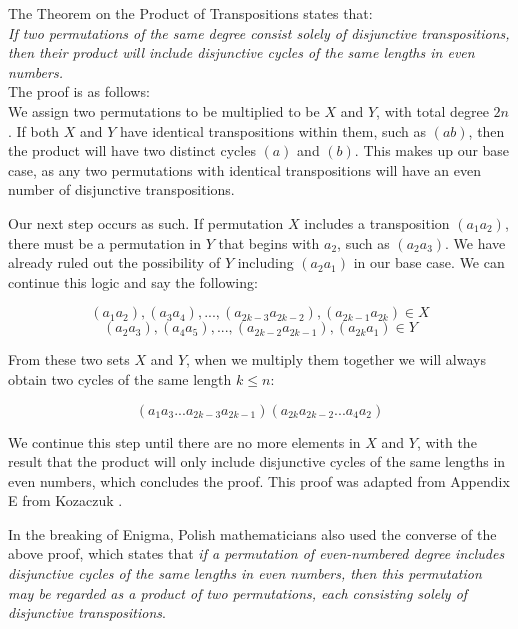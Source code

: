 The Theorem on the Product of Transpositions states that:
\\

\textit{If two permutations of the same degree consist solely of disjunctive transpositions, then their product will include disjunctive cycles of the same lengths in even numbers.}
\\

The proof is as follows:
\\

We assign two permutations to be multiplied to be $X$ and $Y$, with total degree $2n$. If both $X$ and $Y$ have identical transpositions within them, such as $(ab)$, then the product will have two distinct cycles $(a)$ and $(b)$. This makes up our base case, as any two permutations with identical transpositions will have an even number of disjunctive transpositions.

Our next step occurs as such. If permutation $X$ includes a transposition $(a_1 a_2)$, there must be a permutation in $Y$ that begins with $a_2$, such as $(a_2 a_3)$. We have already ruled out the possibility of $Y$ including $(a_2 a_1)$ in our base case. We can continue this logic and say the following:

$$(a_1 a_2), (a_3 a_4), ..., (a_{2k-3} a_{2k-2}), (a_{2k-1} a_{2k}) \in X$$
$$(a_2 a_3), (a_4 a_5), ..., (a_{2k-2} a_{2k-1}), (a_{2k} a_{1}) \in Y$$

From these two sets $X$ and $Y$, when we multiply them together we will always obtain two cycles of the same length $k \leq n$:

$$(a_1 a_3 ... a_{2k-3} a_{2k-1}) (a_{2k} a_{2k-2} ... a_4 a_2)$$

We continue this step until there are no more elements in $X$ and $Y$, with the result that the product will only include disjunctive cycles of the same lengths in even numbers, which concludes the proof. This proof was adapted from Appendix E from Kozaczuk \cite{wk85}.

In the breaking of Enigma, Polish mathematicians also used the converse of the above proof, which states that \textit{if a permutation of even-numbered degree includes disjunctive cycles of the same lengths in even numbers, then this permutation may be regarded as a product of two permutations, each consisting solely of disjunctive transpositions}.
